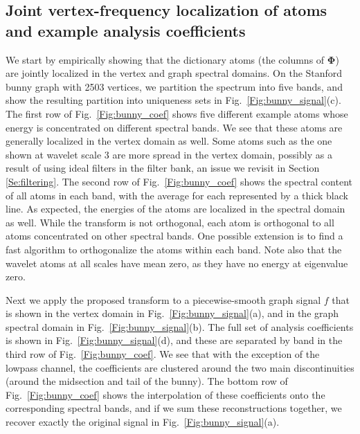 \documentclass[journal, 10pt]{IEEEtran}
\begin{document}
\subsection{Joint vertex-frequency localization of atoms and example analysis coefficients}
We start by empirically showing that the dictionary atoms (the columns of $\boldsymbol{\Phi}$) are jointly localized in the vertex and graph spectral domains. On the Stanford bunny graph \cite{bunny} with 2503 vertices, we partition the spectrum into five bands, and show the resulting partition into uniqueness sets 
in Fig.\ \ref{Fig:bunny_signal}(c). The first row of Fig.\ \ref{Fig:bunny_coef} shows five different example atoms whose energy is concentrated on different spectral bands. We see that these atoms are generally localized in the vertex domain as well. Some atoms such as the one shown at wavelet scale 3 are more spread in the vertex domain, possibly as a result of using ideal filters in the filter bank, an issue we revisit in Section \ref{Se:filtering}. The second row of Fig.\ \ref{Fig:bunny_coef} shows the spectral content of all atoms in each band, with the average for each represented by a thick black line. As expected, the energies of the atoms are localized in the spectral domain as well. While the transform is not orthogonal, each atom is orthogonal to all atoms concentrated on other spectral bands. One possible extension is to find a fast algorithm to orthogonalize the atoms within each band. Note also that the wavelet atoms at all scales have mean zero, as they have no energy at eigenvalue zero.

Next we apply the proposed transform to a piecewise-smooth graph signal $f$ that is shown in the vertex domain in Fig.\ \ref{Fig:bunny_signal}(a), and in the graph spectral domain in Fig.\ \ref{Fig:bunny_signal}(b). The full set of analysis coefficients is shown in Fig.\ \ref{Fig:bunny_signal}(d), and these are separated by band in the third row of Fig.\ \ref{Fig:bunny_coef}. We see that with the exception of the lowpass channel, the coefficients are clustered around the two main discontinuities (around the midsection and tail of the bunny). The bottom row of Fig.\ \ref{Fig:bunny_coef} shows the interpolation of these coefficients onto the corresponding spectral bands, and if we sum these reconstructions together, we recover exactly the original signal in Fig.\ \ref{Fig:bunny_signal}(a).
\end{document}
